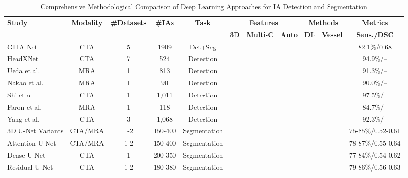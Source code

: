 \documentclass[conference]{IEEEtran}
\newcommand{\cmark}{\ding{51}}
\newcommand{\xmark}{\ding{55}}
\begin{document}
\begin{table}[htbp]
\caption{Comprehensive Methodological Comparison of Deep Learning Approaches for IA Detection and Segmentation}
\begin{center}
\scriptsize
\begin{tabular}{|l|c|c|c|c|c|c|c|c|c|c|}
\hline
\multirow{2}{*}{\textbf{Study}} & \multirow{2}{*}{\textbf{Modality}} & \multirow{2}{*}{\textbf{\#Datasets}} & \multirow{2}{*}{\textbf{\#IAs}} & \multirow{2}{*}{\textbf{Task}} & \multicolumn{3}{c|}{\textbf{Features}} & \multicolumn{2}{c|}{\textbf{Methods}} & \textbf{Metrics} \\
\cline{6-11}
& & & & & \textbf{3D} & \textbf{Multi-C} & \textbf{Auto} & \textbf{DL} & \textbf{Vessel} & \textbf{Sens./DSC} \\
\hline
\hline
GLIA-Net \cite{bo2021toward} & CTA & 5 & 1909 & Det+Seg & \cmark & \cmark & \cmark & \cmark & \cmark & 82.1\%/0.68 \\
\hline
HeadXNet \cite{park2019headxnet} & CTA & 7 & 524 & Detection & \cmark & \cmark & \cmark & \cmark & \xmark & 94.9\%/-- \\
\hline
Ueda et al. \cite{ueda2019deep} & MRA & 1 & 813 & Detection & \cmark & \xmark & \cmark & \cmark & \xmark & 91.3\%/-- \\
\hline
Nakao et al. \cite{nakao2018deep} & MRA & 1 & 90 & Detection & \cmark & \xmark & \cmark & \cmark & \xmark & 90.0\%/-- \\
\hline
Shi et al. \cite{shi2020deep} & CTA & 1 & 1,011 & Detection & \cmark & \xmark & \cmark & \cmark & \cmark & 97.5\%/-- \\
\hline
Faron et al. \cite{faron2020performance} & MRA & 1 & 118 & Detection & \cmark & \xmark & \cmark & \cmark & \xmark & 84.7\%/-- \\
\hline
Yang et al. \cite{yang2021intracranial} & CTA & 3 & 1,068 & Detection & \cmark & \cmark & \cmark & \cmark & \cmark & 92.3\%/-- \\
\hline
3D U-Net Variants & CTA/MRA & 1-2 & 150-400 & Segmentation & \cmark & \xmark & \cmark & \cmark & \cmark & 75-85\%/0.52-0.61 \\
\hline
Attention U-Net & CTA/MRA & 1-2 & 150-400 & Segmentation & \cmark & \xmark & \cmark & \cmark & \cmark & 78-87\%/0.55-0.64 \\
\hline
Dense U-Net & CTA & 1 & 200-350 & Segmentation & \cmark & \xmark & \cmark & \cmark & \cmark & 77-84\%/0.54-0.62 \\
\hline
Residual U-Net & CTA & 1-2 & 180-380 & Segmentation & \cmark & \xmark & \cmark & \cmark & \cmark & 79-86\%/0.56-0.63 \\

\end{tabular}
\end{center}
\end{table}
\end{document}
